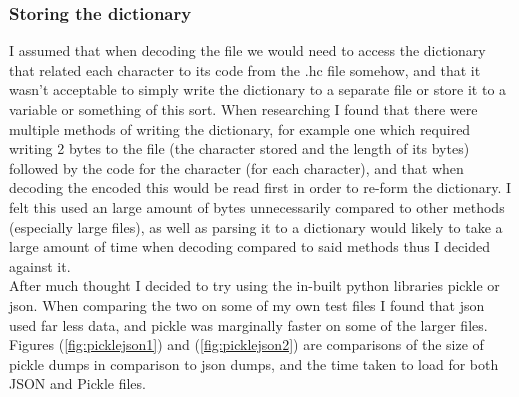 \documentclass{mm2}
\begin{document}
\subsubsection{Storing the dictionary}
I assumed that when decoding the file we would need to access the dictionary that related each character to its code from the .hc file somehow, and that it wasn't acceptable to simply write the dictionary to a separate file or store it to a variable or something of this sort. When researching I found that there were multiple methods of writing the dictionary, for example one which required writing 2 bytes to the file (the character stored and the length of its bytes) followed by the code for the character (for each character), and that when decoding the encoded this would be read first in order to re-form the dictionary. I felt this used an large amount of bytes unnecessarily compared to other methods (especially large files), as well as parsing it to a dictionary would likely to take a large amount of time when decoding compared to said methods thus I decided against it.\\
After much thought I decided to try using the in-built python libraries pickle or json. When comparing the two on some of my own test files I found that json used far less data, and pickle was marginally faster on some of the larger files. Figures (\ref{fig:picklejson1}) and (\ref{fig:picklejson2}) are comparisons of the size of pickle dumps in comparison to json dumps, and the time taken to load for both JSON and Pickle files.
\end{document}
